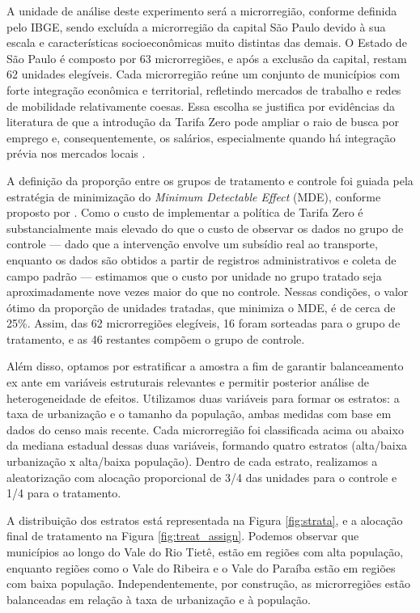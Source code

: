 A unidade de análise deste experimento será a microrregião, conforme definida pelo IBGE, sendo excluída a microrregião da capital São Paulo devido à sua escala e características socioeconômicas muito distintas das demais. O Estado de São Paulo é composto por 63 microrregiões, e após a exclusão da capital, restam 62 unidades elegíveis. Cada microrregião reúne um conjunto de municípios com forte integração econômica e territorial, refletindo mercados de trabalho e redes de mobilidade relativamente coesas. Essa escolha se justifica por evidências da literatura de que a introdução da Tarifa Zero pode ampliar o raio de busca por emprego e, consequentemente, os salários, especialmente quando há integração prévia nos mercados locais .

A definição da proporção entre os grupos de tratamento e controle foi guiada pela estratégia de minimização do \textit{Minimum Detectable Effect} (MDE), conforme proposto por . Como o custo de implementar a política de Tarifa Zero é substancialmente mais elevado do que o custo de observar os dados no grupo de controle --- dado que a intervenção envolve um subsídio real ao transporte, enquanto os dados são obtidos a partir de registros administrativos e coleta de campo padrão --- estimamos que o custo por unidade no grupo tratado seja aproximadamente nove vezes maior do que no controle. Nessas condições, o valor ótimo da proporção de unidades tratadas, que minimiza o MDE, é de cerca de 25\%. Assim, das 62 microrregiões elegíveis, 16 foram sorteadas para o grupo de tratamento, e as 46 restantes compõem o grupo de controle.

Além disso, optamos por estratificar a amostra a fim de garantir balanceamento ex ante em variáveis estruturais relevantes e permitir posterior análise de heterogeneidade de efeitos. Utilizamos duas variáveis para formar os estratos: a taxa de urbanização e o tamanho da população, ambas medidas com base em dados do censo mais recente. Cada microrregião foi classificada acima ou abaixo da mediana estadual dessas duas variáveis, formando quatro estratos (alta/baixa urbanização x alta/baixa população). Dentro de cada estrato, realizamos a aleatorização com alocação proporcional de 3/4 das unidades para o controle e 1/4 para o tratamento.

A distribuição dos estratos está representada na Figura \ref{fig:strata}, e a alocação final de tratamento na Figura \ref{fig:treat_assign}. Podemos observar que municípios ao longo do Vale do Rio Tietê, estão em regiões com alta população, enquanto regiões como o Vale do Ribeira e o Vale do Paraíba estão em regiões com baixa população. Independentemente, por construção, as microrregiões estão balanceadas em relação à taxa de urbanização e à população. 

